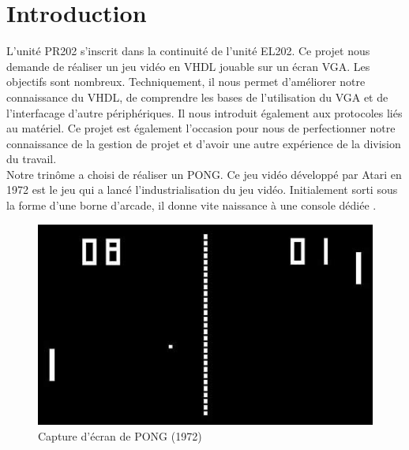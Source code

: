 \section{Introduction}
L'unité PR202 s'inscrit dans la continuité de l'unité EL202. Ce projet nous demande de réaliser un jeu vidéo en VHDL jouable sur un écran VGA. Les objectifs sont nombreux. Techniquement, il nous permet d'améliorer notre connaissance du VHDL, de comprendre les bases de l'utilisation du VGA et de l'interfacage d'autre périphériques. Il nous introduit également aux protocoles liés au matériel. Ce projet est également l'occasion pour nous de perfectionner notre connaissance de la gestion de projet et d'avoir une autre expérience de la division du travail.\\

Notre trinôme a choisi de réaliser un PONG. Ce jeu vidéo développé par Atari en 1972 est le jeu qui a lancé l'industrialisation du jeu vidéo. Initialement sorti sous la forme d'une borne d'arcade, il donne vite naissance à une console dédiée \cite{cite:pong}.\\

\begin{figure}[h!]
	\centering
	\includegraphics[scale=0.75]{images/pong.jpg}
	\caption{Capture d'écran de PONG (1972)}
	\label{fig:pong}
\end{figure}

\newpage
